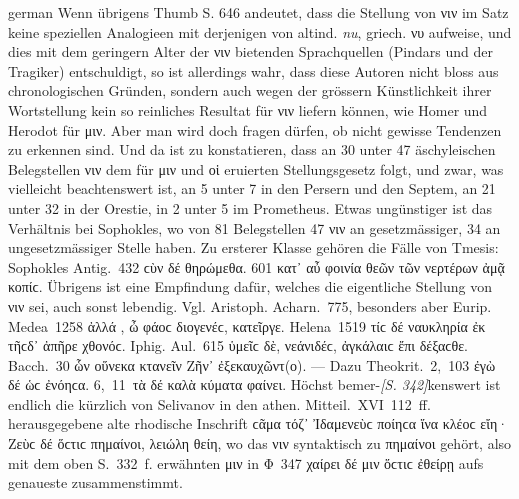 \begin{otherlanguage*}{german}
Wenn übrigens Thumb S. 646 andeutet, dass die Stellung von νιν im Satz keine speziellen Analogieen mit derjenigen von altind. \emph{nu}, griech. νυ aufweise, und dies mit dem geringern Alter der νιν bietenden Sprachquellen (Pindars und der Tragiker) entschuldigt, so ist allerdings wahr, dass diese Autoren nicht bloss aus chronologischen Gründen, sondern auch wegen der grössern Künstlichkeit ihrer Wortstellung kein so reinliches Resultat für νιν liefern können, wie Homer und Herodot für μιν. Aber man wird doch fragen dürfen, ob nicht gewisse Tendenzen zu erkennen sind. Und da ist zu konstatieren, dass an 30 unter 47 äschyleischen Belegstellen νιν dem für μιν und οἱ eruierten Stellungsgesetz folgt, und zwar, was vielleicht beachtenswert ist, an 5 unter 7 in den Persern und den Septem, an 21 unter 32 in der Orestie, in 2 unter 5 im Prometheus. Etwas ungünstiger ist das Verhältnis bei Sophokles, wo von 81 Belegstellen 47 νιν an gesetzmässiger, 34 an ungesetzmässiger Stelle haben. Zu ersterer Klasse gehören die Fälle von Tmesis: Sophokles Antig.~432 ϲὺν δέ  θηρώμεθα. 601 κατ᾽ αὖ  φοινία θεῶν τῶν νερτέρων ἀμᾷ κοπίϲ. Übrigens ist eine Empfindung dafür, welches die eigentliche Stellung von νιν sei, auch sonst lebendig. Vgl. Aristoph. Acharn.~775, besonders aber Eurip. Medea~1258 ἀλλά , ὦ φάοϲ διογενέϲ, κατεῖργε. Helena~1519 τίϲ δέ  ναυκληρία ἐκ τῆϲδ᾽ ἀπῆρε χθονόϲ. Iphig. Aul.~615 ὑμεῖϲ δὲ, νεάνιδέϲ,  ἀγκάλαιϲ ἔπι δέξαϲθε. Bacch.~30 ὧν  οὕνεκα κτανεῖν Ζῆν᾽ ἐξεκαυχῶντ(ο). — Dazu Theokrit.~2,~103 ἐγὼ δέ  ὡϲ ἐνόηϲα. 6,~11~τὰ δέ  καλὰ κύματα φαίνει. Höchst bemer-\hypertarget{p342}{\emph{[S. 342]}}\label{p342}kenswert ist endlich die kürzlich von Selivanov in den athen. Mitteil.~XVI~112~ff. herausgegebene alte rhodische Inschrift ϲᾶμα τόζ᾽ Ἰδαμενεὺϲ ποίηϲα ἵνα κλέοϲ εἴη· Ζεὺϲ δέ  ὅϲτιϲ πημαίνοι, λειώλη θείη, wo das νιν syntaktisch zu πημαίνοι gehört, also mit dem oben S.~332~f. erwähnten μιν in Φ~347 χαίρει δέ μιν ὅϲτιϲ ἐθείρῃ aufs genaueste zusammenstimmt.


\end{otherlanguage*}
